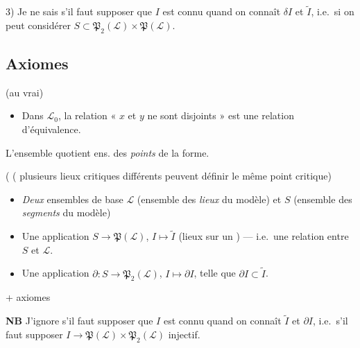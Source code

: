 \documentclass[11pt,a4paper]{article}
\begin{document}
3) Je ne sais s'il faut supposer que $I$ est connu quand on connaît $\delta I$ et $\widetilde{I}$, i.e.\ si on peut considérer $S \subset \mathfrak{P}_2(\mathcal{L}) \times \mathfrak{P}(\mathcal{L})$.

\subsection{Axiomes}

(au vrai)  

\begin{itemize}
  \item[E$_1$] Dans $\mathcal{L}_0$, la relation « $x$ et $y$ \struck{\ill{}} ne sont \ill{} disjoints » est une relation d'équivalence.
\end{itemize}

L'ensemble  quotient ens. des \emph{points}  de la forme.

(\struck{\ill{}} ( plusieurs lieux critiques différents peuvent définir le même point critique)

\begin{itemize}
  \item[1)] \emph{Deux} ensembles de base $\mathcal{L}$ (ensemble des \emph{lieux} du modèle) et $S$ (ensemble des \emph{segments} du modèle)
  \item[2)] Une application $S \to \mathfrak{P}(\mathcal{L})$, $I \mapsto \widetilde{I}$ (lieux sur un ) --- i.e.\ une relation entre $S$ et $\mathcal{L}$.
  \item[3)] Une application $\partial : S \to \mathfrak{P}_2(\mathcal{L})$, $I \mapsto \partial I$, telle que $\partial I \subset \widetilde{I}$.
\end{itemize}
+ axiomes

\textbf{NB} J'ignore s'il faut supposer que $I$ est connu quand on connaît $\widetilde{I}$ et $\partial I$, i.e.\ s'il faut supposer $I \to \mathfrak{P}(\mathcal{L}) \times \mathfrak{P}_2(\mathcal{L})$ injectif.
\end{document}
